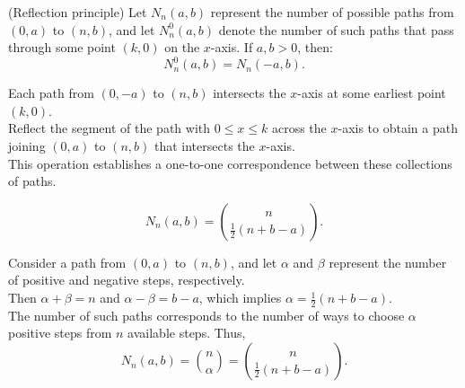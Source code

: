 \documentclass{huhtakm-template-book}
\begin{document}
    \newpage
    \begin{thm}(Reflection principle)
        Let $N_{n}(a,b)$ represent the number of possible paths from $(0,a)$ to $(n,b)$, and let $N_{n}^{0}(a,b)$ denote the number of such paths that pass through some point $(k,0)$ on the $x$-axis. If $a,b>0$, then:
        \begin{equation*}
            N_{n}^{0}(a,b)=N_{n}(-a,b).
        \end{equation*}
    \end{thm}
    \begin{proofing}
        Each path from $(0,-a)$ to $(n,b)$ intersects the $x$-axis at some earliest point $(k,0)$.\\
        Reflect the segment of the path with $0\leq x\leq k$ across the $x$-axis to obtain a path joining $(0,a)$ to $(n,b)$ that intersects the $x$-axis.\\
        This operation establishes a one-to-one correspondence between these collections of paths.
    \end{proofing}
    \begin{lem}
        \label{Number of paths calculation}
        \begin{equation*}
            N_{n}(a,b)=\binom{n}{\frac{1}{2}(n+b-a)}.
        \end{equation*}
    \end{lem}
    \begin{proofing}
        Consider a path from $(0,a)$ to $(n,b)$, and let $\alpha$ and $\beta$ represent the number of positive and negative steps, respectively.\\
        Then $\alpha+\beta=n$ and $\alpha-\beta=b-a$, which implies $\alpha=\frac{1}{2}(n+b-a)$.\\
        The number of such paths corresponds to the number of ways to choose $\alpha$ positive steps from $n$ available steps. Thus,
        \begin{equation*}
            N_{n}(a,b)=\binom{n}{\alpha}=\binom{n}{\frac{1}{2}(n+b-a)}.
        \end{equation*}
    \end{proofing}
\end{document}
